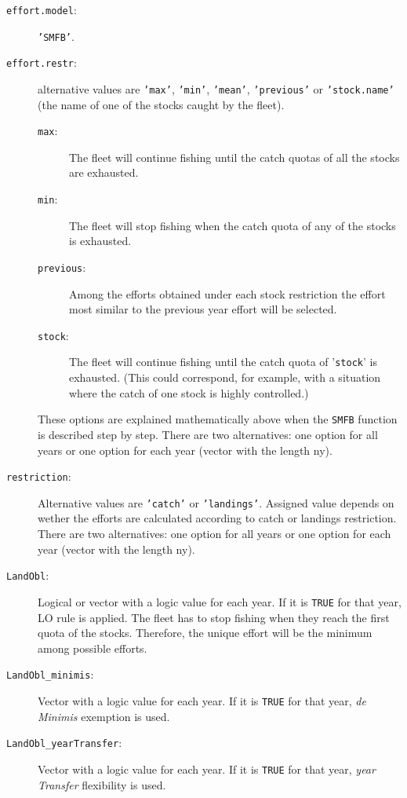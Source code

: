 		\begin{description}
			\item[\texttt{effort.model}:] \texttt{'SMFB'}.
			\item[\texttt{effort.restr}:] alternative values are \texttt{'max'}, \texttt{'min'}, \texttt{'mean'}, 
			  \texttt{'previous'} or \texttt{'stock.name'} (the name of one of the stocks caught by the fleet). 
				\begin{description}
					\item[\texttt{max}:] The fleet will continue fishing until the catch quotas of all the stocks are exhausted. 
					\item[\texttt{min}:] The fleet will stop fishing when the catch quota of any of the stocks is exhausted. 
					\item[\texttt{previous}:] Among the efforts obtained under each stock restriction the effort most similar 
					  to the previous year effort will be selected. 
					\item[\texttt{stock}:] The fleet will continue fishing until the catch quota of '\texttt{stock}' is exhausted. 
					  (This could correspond, for example, with a situation where the catch of one stock is highly controlled.)								\end{description}
				These options are explained mathematically above when the \texttt{SMFB} function is described step by step. 
			  There are two alternatives: one option for all years or one option for each year (vector with the length ny).
			\item[\texttt{restriction}:] Alternative values are \texttt{'catch'} or \texttt{'landings'}. 
			  Assigned value depends on wether the efforts are calculated according to catch or landings restriction. 
			  There are two alternatives: one option for all years or one option for each year (vector with the length ny).
      \item[\texttt{LandObl}:] Logical or vector with a logic value for each year. 
        If it is \texttt{TRUE} for that year, LO rule is applied. 
        The fleet has to stop fishing when they reach the first quota of the stocks. 
        Therefore, the unique effort will be the minimum among possible efforts. 
			\item[\texttt{LandObl\_minimis}:] Vector with a logic value for each year. 
			  If it is \texttt{TRUE} for that year, \textit{de Minimis} exemption is used.
			\item[\texttt{LandObl\_yearTransfer}:] Vector with a logic value for each year. 
			  If it is \texttt{TRUE} for that year, \textit{year Transfer} flexibility is used.

\end{description}
